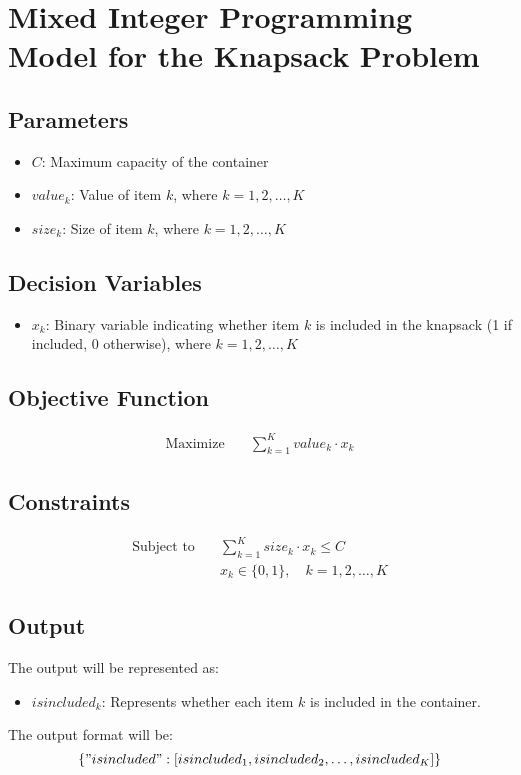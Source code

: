 \documentclass{article}
\begin{document}
\section*{Mixed Integer Programming Model for the Knapsack Problem}

\subsection*{Parameters}
\begin{itemize}
    \item $C$: Maximum capacity of the container
    \item $value_k$: Value of item $k$, where $k = 1, 2, \ldots, K$
    \item $size_k$: Size of item $k$, where $k = 1, 2, \ldots, K$
\end{itemize}

\subsection*{Decision Variables}
\begin{itemize}
    \item $x_k$: Binary variable indicating whether item $k$ is included in the knapsack (1 if included, 0 otherwise), where $k = 1, 2, \ldots, K$
\end{itemize}

\subsection*{Objective Function}
\begin{align*}
\text{Maximize} \quad & \sum_{k=1}^{K} value_k \cdot x_k
\end{align*}

\subsection*{Constraints}
\begin{align*}
\text{Subject to} \quad & \sum_{k=1}^{K} size_k \cdot x_k \leq C \\
& x_k \in \{0, 1\}, \quad k = 1, 2, \ldots, K
\end{align*}

\subsection*{Output}
The output will be represented as:
\begin{itemize}
    \item $isincluded_k$: Represents whether each item $k$ is included in the container.
\end{itemize}
The output format will be:
\[
\{ "isincluded": [isincluded_{1}, isincluded_{2}, \ldots, isincluded_{K}] \}
\]
\end{document}
